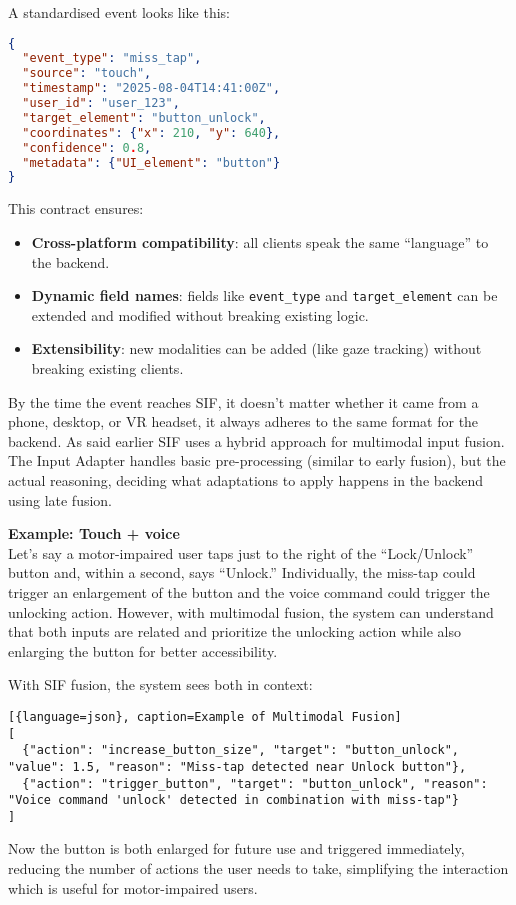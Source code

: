 A standardised event looks like this:
\begin{lstlisting}[language=json, caption={Standardised Event Example}]
{
  "event_type": "miss_tap",
  "source": "touch",
  "timestamp": "2025-08-04T14:41:00Z",
  "user_id": "user_123",
  "target_element": "button_unlock",
  "coordinates": {"x": 210, "y": 640},
  "confidence": 0.8,
  "metadata": {"UI_element": "button"}
}
\end{lstlisting}
This contract ensures:
\begin{itemize}
    \item \textbf{Cross-platform compatibility}: all clients speak the same “language” to the backend.
    \item \textbf{Dynamic field names}: fields like \texttt{event\_type} and \texttt{target\_element} can be extended and modified without breaking existing logic.
    \item \textbf{Extensibility}: new modalities can be added (like gaze tracking) without breaking existing clients.
\end{itemize}
By the time the event reaches SIF, it doesn’t matter whether it came from a phone, desktop, or VR headset, it always adheres to the same format for the backend.
As said earlier SIF uses a hybrid approach for multimodal input fusion. The Input Adapter handles basic pre-processing (similar to early fusion), but the actual reasoning, deciding what adaptations to apply happens in the backend using late fusion.

\textbf{Example: Touch + voice} \\
Let’s say a motor-impaired user taps just to the right of the “Lock/Unlock” button and, within a second, says “Unlock.”
Individually, the miss-tap could trigger an enlargement of the button and the voice command could trigger the unlocking action. However, with multimodal fusion, the system can understand that both inputs are related and prioritize the unlocking action while also enlarging the button for better accessibility.

With SIF fusion, the system sees both in context:

\begin{lstlisting}[{language=json}, caption=Example of Multimodal Fusion]
[
  {"action": "increase_button_size", "target": "button_unlock", "value": 1.5, "reason": "Miss-tap detected near Unlock button"},
  {"action": "trigger_button", "target": "button_unlock", "reason": "Voice command 'unlock' detected in combination with miss-tap"}
]
\end{lstlisting}
Now the button is both enlarged for future use and triggered immediately, reducing the number of actions the user needs to take, simplifying the interaction which is useful for motor-impaired users.

